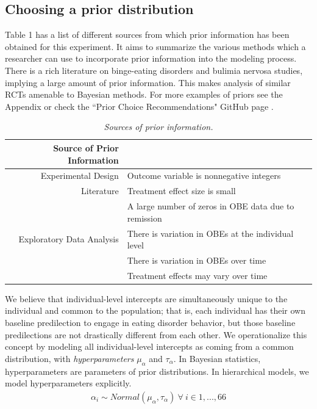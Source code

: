\documentclass{article}
\begin{document}
\subsection*{Choosing a prior distribution}
Table 1 has a list of different sources from which prior information has been obtained for this experiment. It aims to summarize the various methods which a researcher can use to incorporate prior information into the modeling process. There is a rich literature on binge-eating disorders and bulimia nervosa studies, implying a large amount of prior information. This makes analysis of similar RCTs amenable to Bayesian methods. For more examples of priors see the Appendix or check the ``Prior Choice Recommendations" GitHub page \cite{prior-choice}.
%
\begin{table}[H]
\centering
\begin{tabular}{r l}
  Source of Prior Information &  \\ 
  \hline  \vspace{0.25em}
  Experimental Design & Outcome variable is nonnegative integers \\
  \vspace{0.25em}
  Literature & Treatment effect size is small \\
                  & A large number of zeros in OBE data due to remission\\
  Exploratory Data Analysis & There is variation in OBEs at the individual level \\
					  & There is variation in OBEs over time \\
                                            & Treatment effects may vary over time \\
    \hline
\end{tabular}
\caption{\emph{Sources of prior information.}}
\end{table}
%
We believe that individual-level intercepts are simultaneously unique to the individual and common to the population; that is, each individual has their own baseline predilection to engage in eating disorder behavior, but those baseline predilections are not drastically different from each other.  We operationalize this concept by modeling all individual-level intercepts as coming from a common distribution, with \emph{hyperparameters} $\mu_{\alpha}$ and $\tau_{\alpha}$.  In Bayesian statistics, hyperparameters are parameters of prior distributions.  In hierarchical models, we model hyperparameters explicitly.
%
\begin{align}
\alpha_i \sim Normal(\mu_{\alpha}, \tau_{\alpha}) \ \forall \ i \in 1,...,66
\end{align} 
\end{document}
